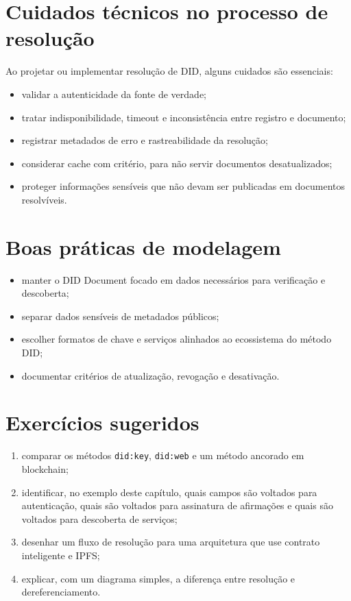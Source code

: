 \section{Cuidados técnicos no processo de resolução}
Ao projetar ou implementar resolução de DID, alguns cuidados são essenciais:
\begin{itemize}[leftmargin=*]
  \item validar a autenticidade da fonte de verdade;
  \item tratar indisponibilidade, timeout e inconsistência entre registro e documento;
  \item registrar metadados de erro e rastreabilidade da resolução;
  \item considerar cache com critério, para não servir documentos desatualizados;
  \item proteger informações sensíveis que não devam ser publicadas em documentos resolvíveis.
\end{itemize}

\section{Boas práticas de modelagem}
\begin{itemize}[leftmargin=*]
  \item manter o DID Document focado em dados necessários para verificação e descoberta;
  \item separar dados sensíveis de metadados públicos;
  \item escolher formatos de chave e serviços alinhados ao ecossistema do método DID;
  \item documentar critérios de atualização, revogação e desativação.
\end{itemize}

\section{Exercícios sugeridos}
\begin{enumerate}[leftmargin=*]
  \item comparar os métodos \texttt{did:key}, \texttt{did:web} e um método ancorado em blockchain;
  \item identificar, no exemplo deste capítulo, quais campos são voltados para autenticação, quais são voltados para assinatura de afirmações e quais são voltados para descoberta de serviços;
  \item desenhar um fluxo de resolução para uma arquitetura que use contrato inteligente e IPFS;
  \item explicar, com um diagrama simples, a diferença entre resolução e dereferenciamento.
\end{enumerate}

